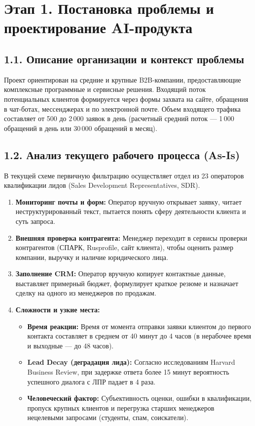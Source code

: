 \documentclass[12pt,a4paper]{article}
\begin{document}
	\section*{Этап 1. Постановка проблемы и проектирование AI-продукта}
	
	\subsection*{1.1. Описание организации и контекст проблемы}
	Проект ориентирован на средние и крупные B2B-компании, предоставляющие комплексные программные и сервисные решения. Входящий поток потенциальных клиентов формируется через формы захвата на сайте, обращения в чат-ботах, мессенджерах и по электронной почте. Объем входящего трафика составляет от 500 до 2\,000 заявок в день (расчетный средний поток --- 1\,000 обращений в день или 30\,000 обращений в месяц).

	\subsection*{1.2. Анализ текущего рабочего процесса (As-Is)}
	В текущей схеме первичную фильтрацию осуществляет отдел из 23 операторов квалификации лидов (Sales Development Representatives, SDR). 
	\begin{enumerate}[noitemsep,topsep=1pt]
		\item \textbf{Мониторинг почты и форм:} Оператор вручную открывает заявку, читает неструктурированный текст, пытается понять сферу деятельности клиента и суть запроса.
		\item \textbf{Внешняя проверка контрагента:} Менеджер переходит в сервисы проверки контрагентов (СПАРК, Rusprofile, сайт клиента), чтобы оценить размер компании, выручку и наличие юридического лица.
		\item \textbf{Заполнение CRM:} Оператор вручную копирует контактные данные, выставляет примерный бюджет, формулирует краткое резюме и назначает сделку на одного из менеджеров по продажам.
		\item \textbf{Сложности и узкие места:}
		\begin{itemize}[noitemsep,topsep=1pt]
			\item \textbf{Время реакции:} Время от момента отправки заявки клиентом до первого контакта составляет в среднем от 40 минут до 4 часов (в нерабочее время и выходные --- до 48 часов).
			\item \textbf{Lead Decay (деградация лида):} Согласно исследованиям Harvard Business Review, при задержке ответа более 15 минут вероятность успешного диалога с ЛПР падает в 4 раза.
			\item \textbf{Человеческий фактор:} Субъективность оценки, ошибки в квалификации, пропуск крупных клиентов и перегрузка старших менеджеров нецелевыми запросами (студенты, спам, соискатели).
		\end{itemize}
	\end{enumerate}
\end{document}
